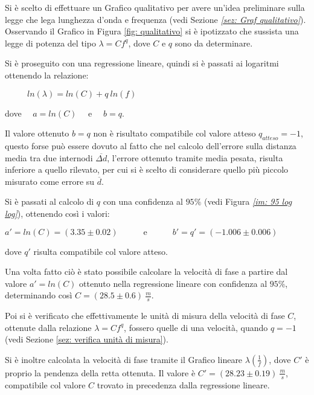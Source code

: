 \documentclass[12pt, a4paper]{article}
\begin{document}
Si è scelto di effettuare un Grafico qualitativo per avere un'idea preliminare sulla legge che lega lunghezza d'onda e frequenza (vedi Sezione \textit{\ref{sez: Graf qualitativo}}). Osservando il Grafico in Figura \ref{fig: qualitativo} si è ipotizzato che sussista una legge di potenza del tipo $\lambda=Cf^q$, dove $C$ e $q$ sono da determinare.

\bigskip

Si è proseguito con una regressione lineare, quindi si è passati ai logaritmi ottenendo la relazione:
\begin{center}
    $\phantom{aaaaa}\displaystyle ln(\lambda)=ln(C)+q\ ln(f)$
\end{center}
dove$\quad$ $a=ln(C)$ $\quad$e$\quad$ $b=q$.
\bigskip

Il valore ottenuto $b=q$ non è risultato compatibile col valore atteso $q_{atteso}=-1$, questo forse può essere dovuto al fatto che nel calcolo dell'errore sulla distanza media tra due internodi $\overline{\Delta d}$, l'errore ottenuto tramite media pesata, risulta inferiore a quello rilevato, per cui si è scelto di considerare quello più piccolo misurato come errore su $\overline{d}$.
\bigskip

Si è passati al calcolo di $q$ con una confidenza al $95\%$ (vedi Figura \textit{\ref{im: 95 log log}}), ottenendo così i valori:
\begin{center}
   $a'=ln(C)=(3.35\pm0.02)\quad\quad\quad \text{e}\quad\quad\quad b'=q'=(-1.006\pm0.006)$ 
\end{center}
dove $q'$ risulta compatibile col valore atteso.
\bigskip

Una volta fatto ciò è stato possibile calcolare la velocità di fase a partire dal valore $a'=ln(C)$ ottenuto nella regressione lineare con confidenza al $95\%$, determinando così $C=(28.5\pm 0.6)\ \frac{m}{s}$.
\bigskip

Poi si è verificato che effettivamente le unità di misura della velocità di fase $C$, ottenute dalla relazione $\lambda=Cf^q$, fossero quelle di una velocità, quando $q=-1$ (vedi Sezione \ref{sez: verifica unità di misura}).
\bigskip

Si è inoltre calcolata la velocità di fase tramite il Grafico lineare $\lambda(\frac{1}{f})$, dove $C'$ è proprio la pendenza della retta ottenuta. Il valore è $C'=(28.23\pm0.19)\ \frac{m}{s}$, compatibile col valore $C$ trovato in precedenza dalla regressione lineare.
\end{document}
